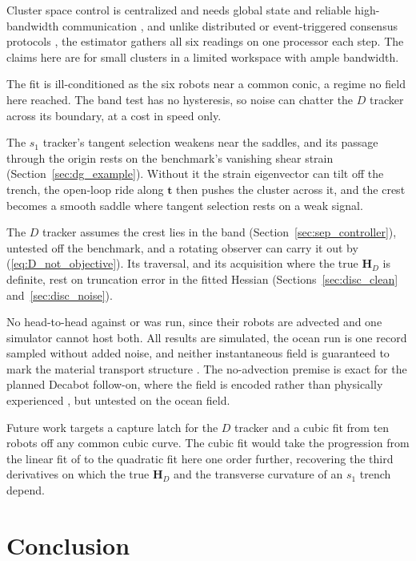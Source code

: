 \documentclass[lettersize,journal]{IEEEtran}
\begin{document}
Cluster space control is centralized and needs global state and reliable
high-bandwidth communication \cite{30}, and unlike distributed or
event-triggered consensus protocols \cite{35}, the estimator gathers all six
readings on one processor each step. The claims here are for small clusters
in a limited workspace with ample bandwidth.

The fit is ill-conditioned as the six robots near a common conic, a
regime no field here reached. The band test has no hysteresis, so noise
can chatter the $D$ tracker across its boundary, at a cost in speed
only.

The $s_1$ tracker's tangent selection weakens near the saddles, and its
passage through the origin rests on the benchmark's vanishing shear
strain (Section~\ref{sec:dg_example}). Without it the strain eigenvector
can tilt off the trench, the open-loop ride along $\mathbf{t}$ then
pushes the cluster across it, and the crest becomes a smooth saddle where
tangent selection rests on a weak signal.

The $D$ tracker assumes the crest lies in the band
(Section~\ref{sec:sep_controller}), untested off the benchmark, and a
rotating observer can carry it out by (\ref{eq:D_not_objective}). Its
traversal, and its acquisition where the true $\mathbf{H}_D$ is
definite, rest on truncation error in the fitted Hessian
(Sections~\ref{sec:disc_clean} and~\ref{sec:disc_noise}).

No head-to-head against \cite{26,27,28} or \cite{29} was run, since
their robots are advected and one simulator cannot host both. All results
are simulated, the ocean run is one record sampled without added noise,
and neither instantaneous field is guaranteed to mark the material
transport structure \cite{18}. The no-advection premise is exact for the
planned Decabot follow-on, where the field is encoded rather than
physically experienced \cite{32}, but untested on the ocean field.

Future work targets a capture latch for the $D$ tracker and a cubic fit
from ten robots off any common cubic curve. The cubic fit would take the
progression from the linear fit of \cite{10} to the quadratic fit here one
order further, recovering the third derivatives on which the true
$\mathbf{H}_D$ and the transverse curvature of an $s_1$ trench depend.

\section{Conclusion}
\end{document}
